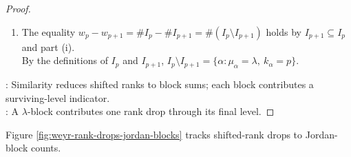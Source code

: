 \begin{theorem}
\begin{proof}
\begin{enumerate}[label=(\roman*)]
Thus $\Delta_{p,\alpha}=\mathbf{1}_{I_p}(\alpha)$, where $\mathbf{1}_{I_p}$ is the indicator of $I_p$, and $w_p=\sum\limits_{\alpha=1}^{s}\mathbf{1}_{I_p}(\alpha)=\#I_p$.
\item The equality $w_p-w_{p+1}=\#I_p-\#I_{p+1}=\#(I_p\setminus I_{p+1})$ holds by $I_{p+1}\subseteq I_p$ and part (i).\\
By the definitions of $I_p$ and $I_{p+1}$, $I_p\setminus I_{p+1}=\{\alpha:\mu_{\alpha}=\lambda,\ k_{\alpha}=p\}$.
\end{enumerate}
: Similarity reduces shifted ranks to block sums; each block contributes a surviving-level indicator.\\
: A $\lambda$-block contributes one rank drop through its final level.
\end{proof}
\end{theorem}

Figure \ref{fig:weyr-rank-drops-jordan-blocks} tracks shifted-rank drops to Jordan-block counts.

\begin{illustrationfigure}[H]
  \centering
  
  \caption{The $p$th shifted-rank drop counts chains of length at least $p$; consecutive differences count size-$p$ blocks.}
  \label{fig:weyr-rank-drops-jordan-blocks}
\end{illustrationfigure}

